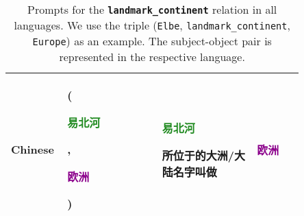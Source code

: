 \begin{table*}[htbp]
\begin{center}
\begin{tabular}{m{0.10\linewidth} p{0.30\linewidth} p{0.30\linewidth} m{0.15\linewidth}}
\midrule
{\centering Chinese} 
    & {\raggedright (\textcolor{forestgreen}{\begin{CJK}{UTF8}{gbsn}易北河\end{CJK}}, \textcolor{darkmagenta}{\begin{CJK}{UTF8}{gbsn}欧洲\end{CJK}})}
    & \textcolor{forestgreen}{\begin{CJK}{UTF8}{gbsn}易北河\end{CJK}}\begin{CJK}{UTF8}{gbsn}所位于的大洲/大陆名字叫做\end{CJK}
    & {\centering \textcolor{darkmagenta}{\begin{CJK}{UTF8}{gbsn}欧洲\end{CJK}}} \\
\bottomrule
\end{tabular}
\end{center}
\caption{Prompts for the \textbf{\texttt{landmark\_continent}} relation in all languages. We use the triple (\texttt{Elbe}, \texttt{landmark\_continent}, \texttt{Europe}) as an example. The subject-object pair is represented in the respective language.}
\label{tab:prompts_landmark_continent}
\end{table*}

